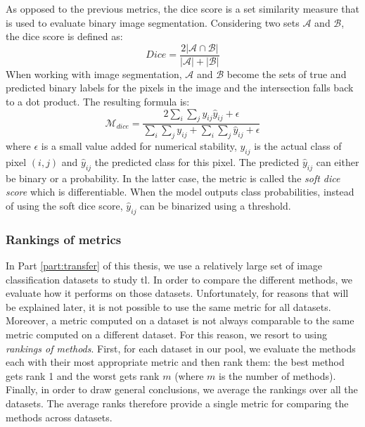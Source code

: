 As opposed to the previous metrics, the dice score is a set similarity measure
that is used to evaluate binary image segmentation. Considering two sets $\mathcal{A}$
and $\mathcal{B}$, the dice score is defined as:
\begin{equation}
\label{eqn:backml:diceAB}
Dice = \frac{2 \left|\mathcal{A}\cap \mathcal{B}\right|}{\left|\mathcal{A}\right| + \left|\mathcal{B}\right|}
\end{equation}
When working with image segmentation, $\mathcal{A}$ and $\mathcal{B}$ become the
sets of true and predicted binary labels for the pixels in the image and the
intersection falls back to a dot product. The resulting formula is:
\begin{equation}
\label{eqn:backml:dice}
\mathcal{M}_{dice} = \dfrac{2 \sum_i\sum_j y_{ij} \hat{y}_{ij} + \epsilon}{\sum_i\sum_j y_{ij} + \sum_i\sum_j \hat{y}_{ij} + \epsilon}
\end{equation}
where $\epsilon$ is a small value added for numerical stability, $y_{ij}$ is the
actual class of pixel $(i, j)$ and $\hat{y}_{ij}$ the predicted class for this
pixel. The predicted $\hat{y}_{ij}$ can either be binary or a probability. In the
latter case, the metric is called the \textit{soft dice score} which is differentiable.
When the model outputs class probabilities, instead of using the soft dice score,
$\hat{y}_{ij}$ can be binarized using a threshold.

\subsubsection{Rankings of metrics}
\label{ssec:backml:metric:rankings}

In Part \ref{part:transfer} of this thesis, we use a relatively large set of image
classification datasets to study \acrlong{tl}. In order to compare the different
methods, we evaluate how it performs on those datasets. Unfortunately, for reasons
that will be explained later, it is not possible to use the same metric for all
datasets. Moreover, a metric computed on a dataset is not always comparable to
the same metric computed on a different dataset. For this reason, we resort to
using \textit{rankings of methods}. First, for each dataset in our pool, we evaluate
the methods each with their most appropriate metric and then rank them: the best
method gets rank 1 and the worst gets rank $m$ (where $m$ is the number of methods).
Finally, in order to draw general conclusions, we average the rankings over all
the datasets. The average ranks therefore provide a single metric for comparing
the methods across datasets.

